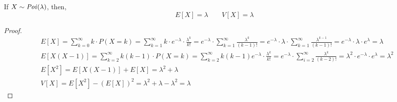 \begin{theorem}
    If $X \sim \text{\emph{Poi}}(\lambda)$, then,
    \begin{equation*}
        E[X] = \lambda \qquad V[X] = \lambda
    \end{equation*}
\end{theorem}
\begin{proof}
    \begin{align*}
        & E[X] = \sum_{k = 0}^\infty k \cdot P(X = k)                         
               = \sum_{k = 1}^\infty k \cdot e^{-\lambda} \cdot
                 \frac{\lambda^k}{k!}                                         
               = e^{-\lambda} \cdot \sum_{k = 1}^\infty
                 \frac{\lambda^k}{(k-1)!}                                     
               = e^{-\lambda} \cdot \lambda \cdot \sum_{k = 1}^\infty
                 \frac{\lambda^{k-1}}{(k-1)!}                                 
               = e^{-\lambda} \cdot \lambda \cdot e^\lambda 
               = \lambda                                                     \\
        & E[X(X-1)] = \sum_{k = 2}^\infty k(k-1) \cdot P(X = k)
                    = \sum_{k = 2}^\infty k(k-1) e^{-\lambda} \cdot
                      \frac{\lambda^k}{k!}
                    = e^{-\lambda} \cdot \sum_{i = 2}^\infty
                      \frac{\lambda^k}{(k-2)!}
                    = \lambda^2 \cdot e^{-\lambda} \cdot e^\lambda
                    = \lambda^2                                              \\
        & E[X^2] = E[X(X - 1)] + E[X] = \lambda^2 + \lambda                  \\
        & V[X] = E[X^2] - (E[X])^2  
               = \lambda^2 + \lambda - \lambda^2
               = \lambda
    \end{align*}
\end{proof}